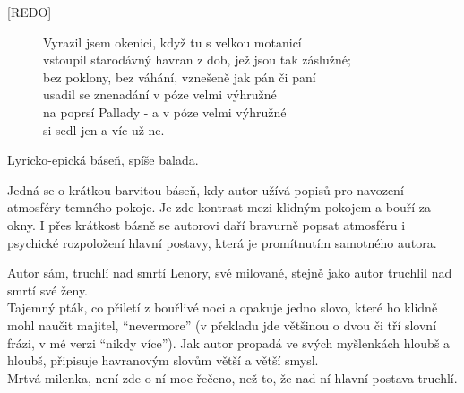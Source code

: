 \documentclass[FGBook.tex]{subfiles}
\begin{document}
\changefontsize{7pt}

[REDO]

\noindent\begin{figure}
\tiny

\setlength{\parindent}{3pt}
\begin{center}
\noindent
Vyrazil jsem okenici, když tu s velkou motanicí \\
vstoupil starodávný havran z dob, jež jsou tak záslužné; \\
bez poklony, bez váhání, vznešeně jak pán či paní \\
usadil se znenadání v póze velmi výhružné \\
na poprsí Pallady - a v póze velmi výhružné \\
si sedl jen a víc už ne. 
\end{center}
\end{figure}


\noindent 
Lyricko-epická báseň, spíše balada.





\noindent 
Jedná se o krátkou barvitou báseň, kdy autor užívá popisů pro navození atmosféry temného pokoje.
Je zde kontrast mezi klidným pokojem a bouří za okny.
I přes krátkost básně se autorovi daří bravurně popsat atmosféru i psychické rozpoložení hlavní postavy,
která je promítnutím samotného autora.

\noindent
{} Autor sám, truchlí nad smrtí Lenory, své milované,
stejně jako autor truchlil nad smrtí své ženy.\\
 Tajemný pták, co přiletí z bouřlivé noci a opakuje jedno slovo,
které ho klidně mohl naučit majitel, \enquote{nevermore}
(v překladu jde většinou o dvou či tří slovní frázi, v mé verzi \enquote{nikdy více}).
Jak autor propadá ve svých myšlenkách hloubš a hloubš, připisuje havranovým slovům větší a větší smysl.\\
 Mrtvá milenka, není zde o ní moc řečeno, než to, že nad ní hlavní postava truchlí.
\end{document}
